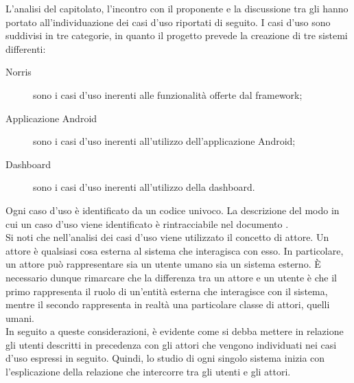 L’analisi del capitolato, l’incontro con il proponente e la discussione tra gli  hanno portato all'individuazione dei casi d'uso riportati di seguito. 
I casi d'uso sono suddivisi in tre categorie, in quanto il progetto prevede la creazione di tre sistemi differenti:
\begin{description}
	\item[Norris] sono i casi d'uso inerenti alle funzionalità offerte dal framework;
	\item[Applicazione Android] sono i casi d'uso inerenti all'utilizzo dell'applicazione Android;
	\item[Dashboard] sono i casi d'uso inerenti all'utilizzo della dashboard.
\end{description}
Ogni caso d'uso è identificato da un codice univoco. La descrizione del modo in cui un caso d'uso viene identificato è rintracciabile nel documento .\\
Si noti che nell'analisi dei casi d'uso viene utilizzato il concetto di attore. Un attore è qualsiasi cosa esterna al sistema che interagisca con esso. In particolare, un attore può rappresentare sia un utente umano sia un sistema esterno. È necessario dunque rimarcare che la differenza tra un attore e un utente è che il primo rappresenta il ruolo di un'entità esterna che interagisce con il sistema, mentre il secondo rappresenta in realtà una particolare classe di attori, quelli umani.\\
In seguito a queste considerazioni, è evidente come si debba mettere in relazione gli utenti descritti in precedenza con gli attori che vengono individuati nei casi d'uso espressi in seguito. Quindi, lo studio di ogni singolo sistema inizia con l'esplicazione della relazione che intercorre tra gli utenti e gli attori.

